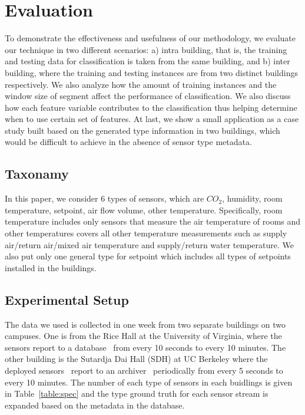 \section{Evaluation}
To demonstrate the effectiveness and usefulness of our methodology, we evaluate our technique in two different scenarios: a) intra building, that is, the 
training and testing data for classification is taken from the same building, and b) inter building, where the training and testing instances are from two 
distinct buildings respectively. We also analyze how the amount of training instances and the window size of segment affect the performance of classification. We also discuss how each feature variable contributes to the classification thus helping determine when to use certain set of features. At last, we show a small application as a case study built based on the generated type information in two buildings, which would be difficult to achieve in the absence of sensor type metadata.

\subsection{Taxonamy}
In this paper, we consider 6 types of sensors, which are $CO_{2}$, humidity, room temperature, setpoint, air flow volume, other temperature. Specifically, room 
temperature includes only sensors that measure the air temperature of rooms and other temperatures covers all other temperature measurements such as supply 
air/return air/mixed air temperature and supply/return water temperature. We also put only one general type for setpoint which includes all types of setpoints 
installed in the buildings.

\subsection{Experimental Setup}
The data we used is collected in one week from two separate buildings on two campuses. One is from the Rice Hall at 
the University of Virginia, where the sensors report to a database~\cite{trane} from every 10 seconds to every 10 minutes. The other building is the Sutardja Dai Hall (SDH) at UC Berkeley where the deployed 
sensors~\cite{keti, bacnet} report to an archiver~\cite{smap} periodically from every 5 seconds to every 10 minutes. The number of each type of sensors in 
each buidlings is given in Table~\ref{table:spec} and the type ground truth for each sensor stream is expanded based on the metadata in the database.

